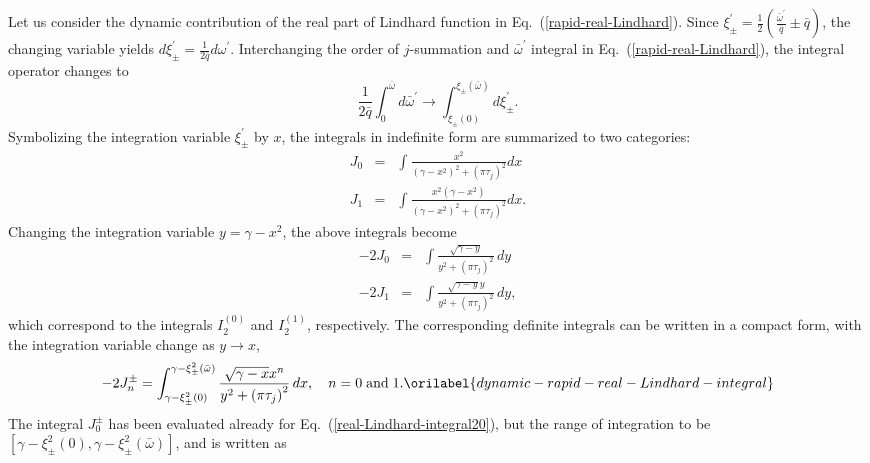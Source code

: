\documentclass[aps,showkeys,noshowpacs,superscriptaddress,pre,preprint]{revtex4-2}
\let\label\orilabel
\begin{document}
Let us consider the dynamic contribution of the real part of Lindhard function in Eq.~(\ref{rapid-real-Lindhard}).
Since $\xi_{\pm}^\prime = \frac{1}{2} \left( \frac{\bar{\omega}^\prime}{\bar{q}} \pm \bar{q} \right)$,
the changing variable yields $d\xi_{\pm}^\prime = \frac{1}{2 \bar{q}} d\omega^\prime$.
Interchanging the order of $j$-summation and $\bar{\omega}^\prime$ integral in Eq.~(\ref{rapid-real-Lindhard}),
the integral operator changes to
\begin{equation*}
\frac{1}{2 \bar{q}} \int_{0}^{\bar{\omega}} d\bar{\omega}^\prime
\rightarrow
 \int_{\xi_{\pm}\left( 0 \right)}^{\xi_{\pm}\left( \bar{\omega} \right)} d\xi_{\pm}^\prime .
\end{equation*}
Symbolizing the integration variable $\xi_{\pm}^\prime$ by $x$,
the integrals in indefinite form are summarized to two categories:
\begin{eqnarray*}
J_0 &=& \int \frac{x^2}{\left( \gamma - x^2 \right)^2 + \left( \pi \tau_j \right)^2} dx 
\\
J_1 &=& \int \frac{x^2 \left( \gamma - x^2 \right)}{\left( \gamma - x^2 \right)^2 + \left( \pi \tau_j \right)^2} dx .
\end{eqnarray*}
Changing the integration variable $y = \gamma - x^2$, the above integrals become
\begin{eqnarray*}
- 2 J_0 &=& \int \frac{\sqrt{\gamma - y}}{y^2 + \left( \pi \tau_j \right)^2} \, dy
\\
-2 J_1 &=& \int \frac{\sqrt{\gamma - y} y}{y^2 + \left( \pi \tau_j \right)^2} \, dy ,
\end{eqnarray*}
which correspond to the integrals $I_2^{(0)}$ and $I_2^{(1)}$, respectively.
The corresponding definite integrals can be written in a compact form,
with the integration variable change as $y \rightarrow x$,
\begin{equation}
-2 J_n^\pm 
= \int_{\gamma - \xi_{\pm}^2 \left( 0 \right)}^{\gamma - \xi_{\pm}^2 \left( \bar{\omega} \right)} 
\frac{\sqrt{\gamma - x} x^n}{y^2 + \left( \pi \tau_j \right)^2} \, dx ,
\quad n = 0 \; \textrm{and} \; 1 .
\label{dynamic-rapid-real-Lindhard-integral}
\end{equation}
The integral $J_0^\pm$ has been evaluated already for Eq.~(\ref{real-Lindhard-integral20}),
but the range of integration to be 
$\left[ \gamma - \xi_\pm^2\left( 0 \right) , \gamma - \xi_\pm^2 \left( \bar{\omega} \right) \right]$,
and is written as
\end{document}
